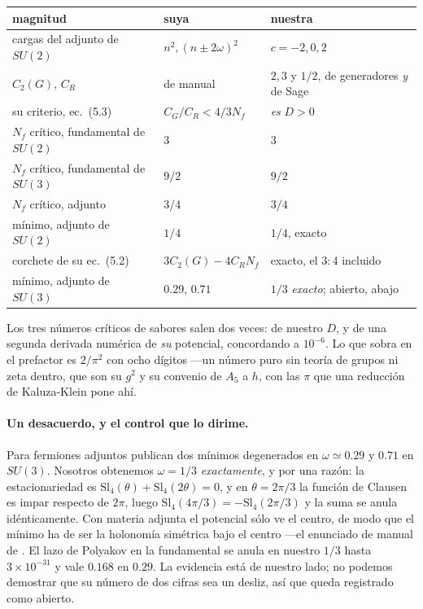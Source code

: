 \documentclass[11pt,a4paper]{article}
\newcommand{\su}[1]{SU(#1)}
\begin{document}
\begin{center}\small
{}
\begin{tabular}{lll}
\toprule
\rowcolor{hdrblue!10}magnitud & suya & nuestra\\
\midrule
cargas del adjunto de $\su2$ & $n^2,(n\pm2\omega)^2$ & $c=-2,0,2$\\
$C_2(G)$, $C_R$ & de manual & $2,3$ y $1/2$, de generadores \emph{y} de Sage\\
su criterio, ec.~(5.3) & $C_G/C_R<4/3N_f$ & \emph{es} $D>0$\\
$N_f$ crítico, fundamental de $\su2$ & $3$ & $3$\\
$N_f$ crítico, fundamental de $\su3$ & $9/2$ & $9/2$\\
$N_f$ crítico, adjunto & $3/4$ & $3/4$\\
mínimo, adjunto de $\su2$ & $1/4$ & $1/4$, exacto\\
corchete de su ec.~(5.2) & $3C_2(G)-4C_RN_f$ & exacto, el $3\!:\!4$ incluido\\
\rowcolor{warmred!13}mínimo, adjunto de $\su3$ & $0.29$, $0.71$ & $1/3$ \emph{exacto}; abierto, abajo\\
\bottomrule
\end{tabular}
\end{center}

\noindent Los tres números críticos de sabores salen dos veces: de nuestro $D$, y de una segunda
derivada numérica de \emph{su} potencial, concordando a $10^{-6}$. Lo que sobra en el prefactor es
$2/\pi^2$ con ocho dígitos ---un número puro sin teoría de grupos ni zeta dentro, que son su $g^2$ y
su convenio de $A_5$ a $h$, con las $\pi$ que una reducción de Kaluza-Klein pone
ahí.

\paragraph{Un desacuerdo, y el control que lo dirime.} Para fermiones adjuntos publican dos mínimos
degenerados en $\omega\simeq0.29$ y $0.71$ en $\su3$. Nosotros obtenemos $\omega=1/3$
\emph{exactamente}, y por una razón: la estacionariedad es
$\mathrm{Sl}_4(\theta)+\mathrm{Sl}_4(2\theta)=0$, y en $\theta=2\pi/3$ la función de Clausen es impar
respecto de $2\pi$, luego $\mathrm{Sl}_4(4\pi/3)=-\mathrm{Sl}_4(2\pi/3)$ y la suma se anula
idénticamente. Con materia adjunta el potencial sólo ve el centro, de modo que el mínimo ha de ser
la holonomía simétrica bajo el centro ---el enunciado de manual de \cite{GPY}. El lazo de Polyakov
en la fundamental se anula en nuestro $1/3$ hasta $3\times10^{-31}$ y vale $0.168$ en $0.29$. La
evidencia está de nuestro lado; no podemos demostrar que su número de dos cifras sea un desliz, así
que queda registrado como abierto.
\end{document}
